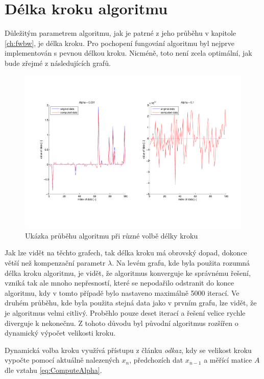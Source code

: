\documentclass[FM,BP]{tulthesis}
\begin{document}
\section{Délka kroku algoritmu}
Důležitým parametrem algoritmu, jak je patrné z jeho průběhu v kapitole \ref{ch:fwbw}, je délka kroku. Pro pochopení fungování algoritmu byl nejprve implementován s pevnou délkou kroku. Nicméně, toto není zcela optimální, jak bude zřejmé z následujících grafů.
\begin{figure}[!ht]
\begin{center}
\includegraphics[scale=0.57]{obr/basic.pdf}
\end{center}
\caption{Ukázka průběhu algoritmu při různé volbě délky kroku}
\label{fig:basicAlpha}
\end{figure} 

Jak lze vidět na těchto grafech, tak délka kroku má obrovský dopad, dokonce větší než kompenzační parametr $\lambda$. Na levém grafu, kde byla použita rozumná délka kroku algoritmu, je vidět, že algoritmus konverguje ke správnému řešení, vzniká tak ale mnoho nepřesností, které se nepodařilo odstranit do konce algoritmu, kdy v tomto případě bylo nastaveno maximálně 5000 iterací. Ve druhém průběhu, kde byla použita stejná data jako v prvním grafu, lze vidět, že je algoritmus velmi citlivý. Proběhlo pouze deset iterací a řešení velice rychle diverguje k nekonečnu. Z tohoto důvodu byl původní algoritmus rozšířen o dynamický výpočet velikosti kroku.

Dynamická volba kroku využívá přístupu z článku \textit{odkaz}, kdy se velikost kroku vypočte pomocí aktuálně nalezených $x_{n}$, předchozích dat $x_{n-1}$ a měřící matice $A$ dle vztahu \ref{eq:ComputeAlpha}.
\end{document}
